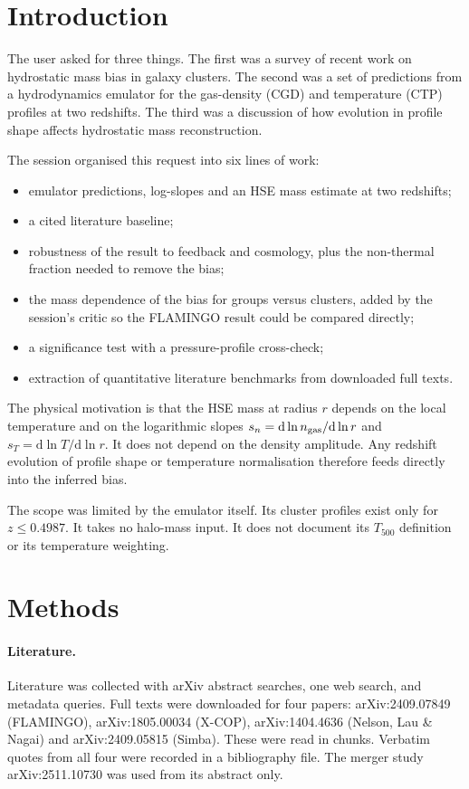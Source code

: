 \documentclass[11pt,a4paper]{article}
\begin{document}
\section{Introduction}

The user asked for three things. The first was a survey of recent work on hydrostatic mass bias in galaxy clusters. The second was a set of predictions from a hydrodynamics emulator for the gas-density (CGD) and temperature (CTP) profiles at two redshifts. The third was a discussion of how evolution in profile shape affects hydrostatic mass reconstruction.

The session organised this request into six lines of work:
\begin{itemize}
\item emulator predictions, log-slopes and an HSE mass estimate at two redshifts;
\item a cited literature baseline;
\item robustness of the result to feedback and cosmology, plus the non-thermal fraction needed to remove the bias;
\item the mass dependence of the bias for groups versus clusters, added by the session's critic so the FLAMINGO result could be compared directly;
\item a significance test with a pressure-profile cross-check;
\item extraction of quantitative literature benchmarks from downloaded full texts.
\end{itemize}

The physical motivation is that the HSE mass at radius $r$ depends on the local temperature and on the logarithmic slopes $s_n=\mathrm{d}\ln n_{\rm gas}/\mathrm{d}\ln r$ and $s_T=\mathrm{d}\ln T/\mathrm{d}\ln r$. It does not depend on the density amplitude. Any redshift evolution of profile shape or temperature normalisation therefore feeds directly into the inferred bias.

The scope was limited by the emulator itself. Its cluster profiles exist only for $z\le0.4987$. It takes no halo-mass input. It does not document its $T_{500}$ definition or its temperature weighting.

\section{Methods}

\paragraph{Literature.}
Literature was collected with arXiv abstract searches, one web search, and metadata queries. Full texts were downloaded for four papers: arXiv:2409.07849 (FLAMINGO), arXiv:1805.00034 (X-COP), arXiv:1404.4636 (Nelson, Lau \& Nagai) and arXiv:2409.05815 (Simba). These were read in chunks. Verbatim quotes from all four were recorded in a bibliography file. The merger study arXiv:2511.10730 was used from its abstract only.
\end{document}
